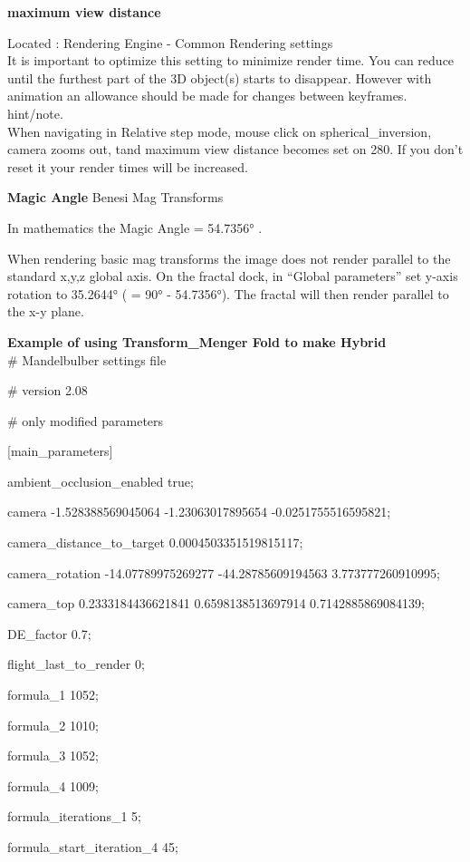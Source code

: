 \textbf{maximum view distance}

Located : Rendering Engine - Common Rendering settings\\[2\baselineskip]It is
important to optimize this setting to minimize render time. You can reduce until
the furthest part of the 3D object(s) starts to disappear. However with
animation an allowance should be made for changes between
keyframes.\\[2\baselineskip]hint/note.\\ When navigating in Relative step mode,
mouse click on spherical\_inversion, camera zooms out, tand maximum view
distance becomes set on 280. If you don't reset it your render times will be
increased.

\textbf{Magic Angle} Benesi Mag Transforms

In mathematics the Magic Angle = 54.7356° .

When rendering basic mag transforms the image does not render parallel to the
standard x,y,z global axis. On the fractal dock, in ``Global parameters'' set
y-axis rotation to 35.2644° ( = 90° - 54.7356°). The fractal will then render
parallel to the x-y plane.

\textbf{Example of using Transform\_Menger Fold to make
	Hybrid}\\[2\baselineskip]\# Mandelbulber settings file

\# version 2.08

\# only modified parameters

{[}main\_parameters{]}

ambient\_occlusion\_enabled true;

camera -1.528388569045064 -1.23063017895654 -0.0251755516595821;

camera\_distance\_to\_target 0.0004503351519815117;

camera\_rotation -14.07789975269277 -44.28785609194563 3.773777260910995;

camera\_top 0.2333184436621841 0.6598138513697914 0.7142885869084139;

DE\_factor 0.7;

flight\_last\_to\_render 0;

formula\_1 1052;

formula\_2 1010;

formula\_3 1052;

formula\_4 1009;

formula\_iterations\_1 5;

formula\_start\_iteration\_4 45;

